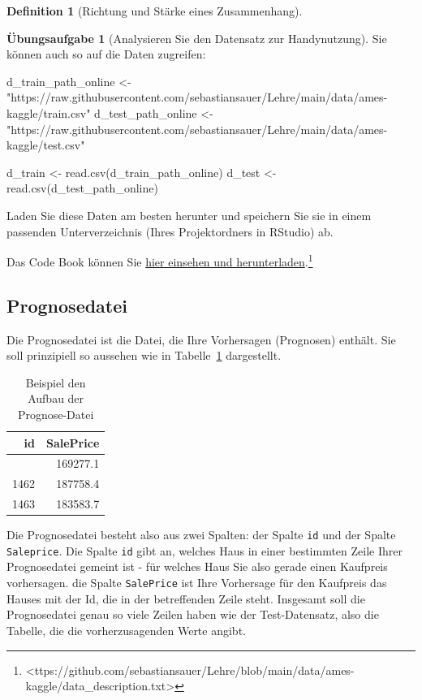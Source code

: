 \documentclass[
  a4paper,
  DIV=11]{scrreprt}
\newenvironment{Shaded}{\begin{snugshade}}{\end{snugshade}}
\newcommand{\FunctionTok}[1]{\textcolor[rgb]{0.28,0.35,0.67}{#1}}
\newcommand{\NormalTok}[1]{\textcolor[rgb]{0.00,0.23,0.31}{#1}}
\newcommand{\OtherTok}[1]{\textcolor[rgb]{0.00,0.23,0.31}{#1}}
\newcommand{\StringTok}[1]{\textcolor[rgb]{0.13,0.47,0.30}{#1}}
\theoremstyle{definition}
\newtheorem{exercise}{Übungsaufgabe}[chapter]
\theoremstyle{definition}
\theoremstyle{definition}
\newtheorem{definition}{Definition}[chapter]
\theoremstyle{remark}
\begin{document}
\begin{definition}[Richtung und Stärke eines
Zusammenhang]
\begin{exercise}[Analysieren Sie den Datensatz zur
Handynutzung]
Sie können auch so auf die Daten zugreifen:

\begin{Shaded}
\begin{Highlighting}[]
\NormalTok{d\_train\_path\_online }\OtherTok{\textless{}{-}} \StringTok{"https://raw.githubusercontent.com/sebastiansauer/Lehre/main/data/ames{-}kaggle/train.csv"}
\NormalTok{d\_test\_path\_online }\OtherTok{\textless{}{-}} \StringTok{"https://raw.githubusercontent.com/sebastiansauer/Lehre/main/data/ames{-}kaggle/test.csv"}

\NormalTok{d\_train }\OtherTok{\textless{}{-}} \FunctionTok{read.csv}\NormalTok{(d\_train\_path\_online)}
\NormalTok{d\_test }\OtherTok{\textless{}{-}} \FunctionTok{read.csv}\NormalTok{(d\_test\_path\_online)}
\end{Highlighting}
\end{Shaded}

Laden Sie diese Daten am besten herunter und speichern Sie sie in einem
passenden Unterverzeichnis (Ihres Projektordners in RStudio) ab.

Das Code Book können Sie
\href{https://github.com/sebastiansauer/Lehre/blob/main/data/ames-kaggle/data_description.txt}{hier
einsehen und herunterladen}.\footnote{\textless ttps://github.com/sebastiansauer/Lehre/blob/main/data/ames-kaggle/data\_description.txt\textgreater{}}

\subsection{Prognosedatei}\label{prognosedatei}

Die Prognosedatei ist die Datei, die Ihre Vorhersagen (Prognosen)
enthält. Sie soll prinzipiell so aussehen wie in Tabelle~\ref{tbl-subm}
dargestellt.

\begin{longtable}{rr}

\caption{\label{tbl-subm}Beispiel den Aufbau der Prognose-Datei}

\tabularnewline

\toprule
id & SalePrice \\ 
\midrule\addlinespace[2.5pt]
1461 & 169277.1 \\ 
1462 & 187758.4 \\ 
1463 & 183583.7 \\ 
\bottomrule

\end{longtable}

Die Prognosedatei besteht also aus zwei Spalten: der Spalte \texttt{id}
und der Spalte \texttt{Saleprice}. Die Spalte \texttt{id} gibt an,
welches Haus in einer bestimmten Zeile Ihrer Prognosedatei gemeint ist -
für welches Haus Sie also gerade einen Kaufpreis vorhersagen. die Spalte
\texttt{SalePrice} ist Ihre Vorhersage für den Kaufpreis das Hauses mit
der Id, die in der betreffenden Zeile steht. Insgesamt soll die
Prognosedatei genau so viele Zeilen haben wie der Test-Datensatz, also
die Tabelle, die die vorherzusagenden Werte angibt.


\end{exercise}
\end{definition}
\end{document}
